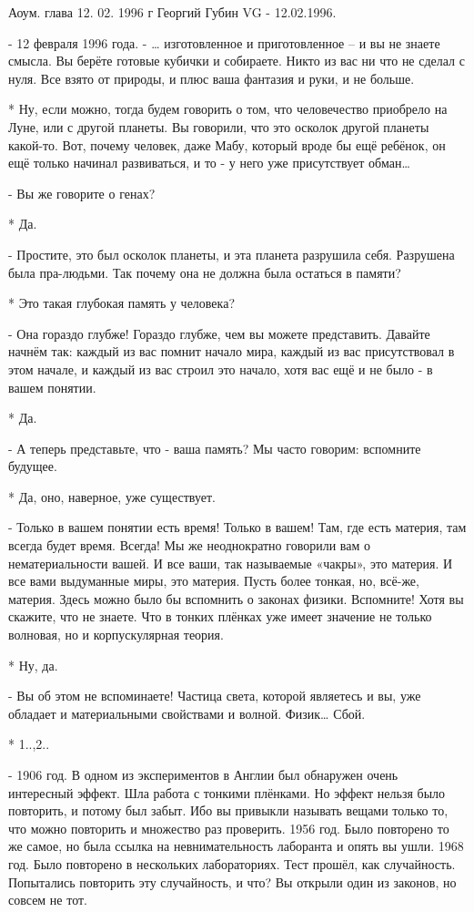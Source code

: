 Аоум. глава 12. 02. 1996 г
Георгий Губин
VG - 12.02.1996.


- 12 февраля 1996 года.
- … изготовленное и приготовленное – и вы не знаете смысла. Вы берёте готовые кубички и собираете. Никто из вас ни что не сделал с нуля. Все взято от природы, и плюс ваша фантазия и руки, и не больше.

* Ну, если можно, тогда будем говорить о том, что человечество приобрело на Луне, или с другой планеты. Вы говорили, что это осколок другой планеты какой-то. Вот, почему человек, даже Мабу, который вроде бы ещё ребёнок, он ещё только начинал развиваться, и то - у него уже присутствует обман…

- Вы же говорите о генах?

* Да.

- Простите, это был осколок планеты, и эта планета разрушила себя. Разрушена была пра-людьми. Так  почему она не должна была остаться в памяти?

* Это такая глубокая память у человека?

- Она гораздо глубже! Гораздо глубже, чем вы можете представить. Давайте начнём так: каждый из вас помнит начало мира, каждый из вас присутствовал в этом начале, и каждый из вас строил это начало, хотя вас ещё и не было - в вашем понятии. 

* Да.

- А теперь представьте, что - ваша память? Мы часто говорим: вспомните будущее.

* Да, оно, наверное, уже существует.

- Только в вашем понятии есть время! Только в вашем! Там, где есть материя, там всегда будет время. Всегда! Мы же неоднократно говорили вам о нематериальности вашей. И все ваши, так называемые «чакры», это материя. И все вами выдуманные миры, это материя. Пусть более тонкая, но, всё-же, материя. Здесь можно было бы вспомнить о законах физики. Вспомните! Хотя вы скажите, что не знаете. Что в тонких плёнках уже имеет значение не только волновая, но и корпускулярная теория.

* Ну, да.

- Вы об этом не вспоминаете! Частица света, которой являетесь и вы, уже обладает и материальными свойствами и волной. Физик… Сбой.

* 1..,2.. 

- 1906 год. В одном из экспериментов в Англии был обнаружен очень интересный эффект. Шла работа с тонкими плёнками. Но эффект нельзя было повторить, и потому был забыт. Ибо вы привыкли называть вещами только то, что можно повторить и множество раз проверить. 1956 год. Было повторено то же самое, но была ссылка на невнимательность лаборанта и опять вы ушли. 1968 год. Было повторено в нескольких лабораториях. Тест прошёл, как случайность. Попытались повторить эту случайность, и что? Вы открыли один из законов, но совсем не тот. 

